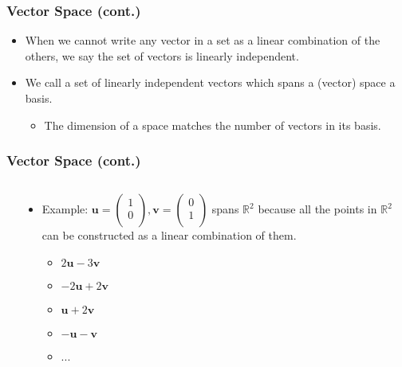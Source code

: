 \documentclass[pdflatex, 12pt]{beamer}
\newcommand{\R}{\mathbb{R}}
\begin{document}
\begin{frame}
\frametitle{Vector Space (cont.)}
\begin{itemize}
\item When we cannot write any vector in a set as a linear combination of the others, we say the set of vectors is {\color{red} linearly independent}.
\vspace{0.4cm}
\item We call a set of linearly independent vectors which spans a (vector) space a {\color{red} basis}.
 \begin{itemize}
 \item The dimension of a space matches the number of vectors in its basis. 
 \end{itemize}
\end{itemize}
\end{frame}

\begin{frame}
\frametitle{Vector Space (cont.)}
\begin{columns}
\begin{column}{0.5\textwidth}
\centering
{}
\end{column}
\begin{column}{0.5\textwidth}
\begin{itemize}
\item Example: $\bm{u} = \begin{pmatrix}
1 \\
0 \\
\end{pmatrix}, \bm{v} = \begin{pmatrix}
0 \\
1 \\
\end{pmatrix}$ spans $\R^2$ because all the points in $\R^2$ can be constructed as a linear combination of them.
 \begin{itemize}
 \item $2\bm{u} - 3\bm{v}$
 \item $-2\bm{u} + 2\bm{v}$
 \item $\bm{u} + 2\bm{v}$
 \item $-\bm{u} - \bm{v}$
 \item ...
 \end{itemize}
\end{itemize}
\end{column}
\end{columns}
\end{frame}
\end{document}
